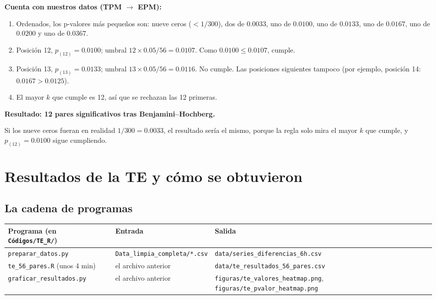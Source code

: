 \documentclass[11pt,openany]{book}
\newcommand{\archivo}[1]{\texttt{\small #1}}
\begin{document}
\textbf{Cuenta con nuestros datos (TPM $\to$ EPM):}
\begin{enumerate}
\item Ordenados, los p-valores más pequeños son: nueve ceros ($<1/300$), dos de $0.0033$, uno de $0.0100$, uno de $0.0133$, uno de $0.0167$, uno de $0.0200$ y uno de $0.0367$.
\item Posición 12, $p_{(12)} = 0.0100$; umbral $12 \times 0.05/56 = 0.0107$. Como $0.0100 \le 0.0107$, cumple.
\item Posición 13, $p_{(13)} = 0.0133$; umbral $13\times0.05/56 = 0.0116$. No cumple. Las posiciones siguientes tampoco (por ejemplo, posición 14: $0.0167 > 0.0125$).
\item El mayor $k$ que cumple es 12, así que se rechazan las 12 primeras.
\end{enumerate}
\textbf{Resultado: 12 pares significativos tras Benjamini--Hochberg.}

\begin{nota}
Si los nueve ceros fueran en realidad $1/300 = 0.0033$, el resultado sería el mismo, porque la regla solo mira el mayor $k$ que cumple, y $p_{(12)} = 0.0100$ sigue cumpliendo.
\end{nota}

\chapter{Resultados de la TE y cómo se obtuvieron}\label{cap:res-te}

\section{La cadena de programas}

\begin{center}\small
\begin{tabular}{>{\raggedright}p{4.2cm}>{\raggedright}p{4.2cm}>{\raggedright\arraybackslash}p{5.6cm}}
\toprule
Programa (en \archivo{Códigos/TE\_R/}) & Entrada & Salida \\
\midrule
\texttt{preparar\_datos.py} & \texttt{Data\_limpia\_completa/}\allowbreak\texttt{*.csv} & \texttt{data/}\allowbreak\texttt{series\_diferencias\_6h.csv} \\
\texttt{te\_56\_pares.R} (unos 4 min) & el archivo anterior & \texttt{data/te\_resultados\_56\_pares.csv} \\
\texttt{graficar\_resultados.py} & el archivo anterior & \texttt{figuras/te\_valores\_heatmap.png}, \texttt{figuras/te\_pvalor\_heatmap.png} \\
\bottomrule
\end{tabular}
\end{center}
\end{document}
